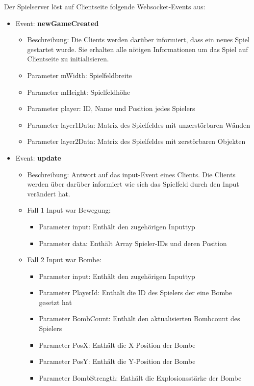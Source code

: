 \documentclass[conference]{IEEEtran}
\begin{document}
Der Spielserver löst auf Clientseite folgende Websocket-Events aus:
\begin{itemize}
\item Event: \textbf{newGameCreated}
\begin{itemize}
\item Beschreibung:
    Die Clients werden darüber informiert, dass ein neues Spiel gestartet wurde. Sie erhalten alle nötigen Informationen um das Spiel auf Clientseite zu initialisieren.
    
\item Parameter \glqq mWidth\grqq{}: Spielfeldbreite
\item Parameter \glqq mHeight\grqq{}: Spielfeldhöhe
\item Parameter \glqq player\grqq{}: ID, Name und Position jedes Spielers
\item Parameter \glqq layer1Data\grqq{}: Matrix des Spielfeldes mit unzerstörbaren Wänden
\item Parameter \glqq layer2Data\grqq{}: Matrix des Spielfeldes mit zerstörbaren Objekten
\end{itemize}

\item Event: \textbf{update}
\begin{itemize}
\item Beschreibung:
    Antwort auf das \glqq input\grqq-Event eines Clients. Die Clients werden über darüber informiert wie sich das Spielfeld durch den Input verändert hat.
    
\item Fall 1 Input war Bewegung:
\begin{itemize}
\item Parameter \glqq input\grqq{}: Enthält den zugehörigen Inputtyp
\item Parameter \glqq data\grqq{}: Enthält Array Spieler-IDs und deren Position
\end{itemize}

\item Fall 2 Input war Bombe:
\begin{itemize}
\item Parameter \glqq input\grqq{}: Enthält den zugehörigen Inputtyp
\item Parameter \glqq PlayerId\grqq{}: Enthält die ID des Spielers der eine Bombe gesetzt hat
\item Parameter \glqq BombCount\grqq{}: Enthält den aktualisierten Bombcount des Spielers
\item Parameter \glqq PosX\grqq{}: Enthält die X-Position der Bombe
\item Parameter \glqq PosY\grqq{}: Enthält die Y-Position der Bombe
\item Parameter \glqq BombStrength\grqq{}: Enthält die Explosionsstärke der Bombe
\end{itemize}
    

\end{itemize}
\end{itemize}
\end{document}
